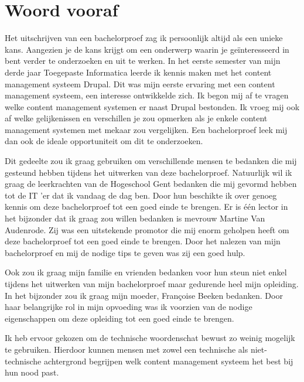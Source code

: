 
\chapter*{Woord vooraf}
\label{ch:voorwoord}


Het uitschrijven van een bachelorproef zag ik persoonlijk altijd als een unieke kans. Aangezien je de kans krijgt om een onderwerp waarin je geïnteresseerd in bent verder te onderzoeken en uit te werken. In het eerste semester van mijn derde jaar Toegepaste Informatica leerde ik kennis maken met het content management systeem Drupal. Dit was mijn eerste ervaring met een content management systeem, een interesse ontwikkelde zich. Ik begon mij af te vragen welke content management systemen er naast Drupal bestonden. Ik vroeg mij ook af welke gelijkenissen en verschillen je zou opmerken als je enkele content management systemen met mekaar zou vergelijken. Een bachelorproef leek mij dan ook de ideale opportuniteit om dit te onderzoeken.

Dit gedeelte zou ik graag gebruiken om verschillende mensen te bedanken die mij gesteund hebben tijdens het uitwerken van deze bachelorproef. Natuurlijk wil ik graag de leerkrachten van de Hogeschool Gent bedanken die mij gevormd hebben tot de IT 'er dat ik vandaag de dag ben. Door hun beschikte ik over genoeg kennis om deze bachelorproef tot een goed einde te brengen. Er is één lector in het bijzonder dat ik graag zou willen bedanken is mevrouw Martine Van Audenrode. Zij was een uitstekende promotor die mij enorm geholpen heeft om deze bachelorproef tot een goed einde te brengen. Door het nalezen van mijn bachelorproef en mij de nodige tips te geven was zij een goed hulp.

Ook zou ik graag mijn familie en vrienden bedanken voor hun steun niet enkel tijdens het uitwerken van mijn bachelorproef maar gedurende heel mijn opleiding. In het bijzonder zou ik graag mijn moeder, Françoise Beeken bedanken. Door haar belangrijke rol in mijn opvoeding was ik voorzien van de nodige eigenschappen om deze opleiding tot een goed einde te brengen.

Ik heb ervoor gekozen om de technische woordenschat bewust zo weinig mogelijk te gebruiken. Hierdoor kunnen mensen met zowel een technische als niet-technische achtergrond begrijpen welk content management systeem het best bij hun nood past.